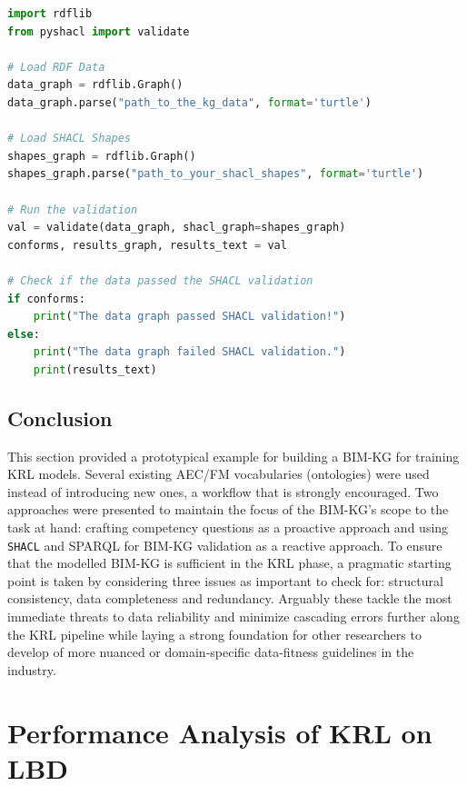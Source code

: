 \begin{lstlisting}[language=python, caption={Python script for loading \ac{RDF} data and \ac{SHACL} shapes for validating a knowledge graph}, label=lst:rdf-and-shapes-loading]
import rdflib
from pyshacl import validate

# Load RDF Data
data_graph = rdflib.Graph()
data_graph.parse("path_to_the_kg_data", format='turtle')

# Load SHACL Shapes
shapes_graph = rdflib.Graph()
shapes_graph.parse("path_to_your_shacl_shapes", format='turtle')

# Run the validation
val = validate(data_graph, shacl_graph=shapes_graph)
conforms, results_graph, results_text = val

# Check if the data passed the SHACL validation
if conforms:
    print("The data graph passed SHACL validation!")
else:
    print("The data graph failed SHACL validation.")
    print(results_text)

\end{lstlisting}

\subsection{Conclusion}
This section provided a prototypical example for building a \ac{BIM-KG} for training \ac{KRL} models. Several existing \ac{AEC/FM} vocabularies (ontologies) were used instead of introducing new ones, a workflow that is strongly encouraged. Two approaches were presented to maintain the focus of the \ac{BIM-KG}'s scope to the task at hand: crafting competency questions as a proactive approach and using \texttt{SHACL} and \ac{SPARQL} for \ac{BIM-KG} validation as a reactive approach. To ensure that the modelled \ac{BIM-KG} is sufficient in the \ac{KRL} phase, a pragmatic starting point is taken by considering three issues as important to check for: structural consistency, data completeness and redundancy. Arguably these tackle the most immediate threats to data reliability and minimize cascading errors further along the KRL pipeline while laying a strong foundation for other researchers to develop of more nuanced or domain-specific data-fitness guidelines in the industry.

\section{Performance Analysis of \acf{KRL} on \acf{LBD}}\label{sec: relational-learning}


